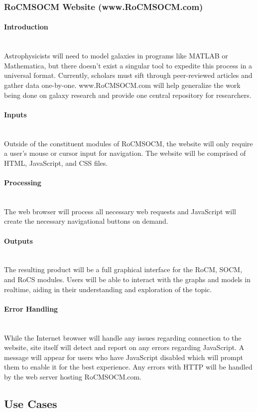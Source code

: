 \documentclass[titlepage]{article}
\newcommand{\myparagraph}[1]{\paragraph{#1}\mbox{}\\}
\begin{document}
\subsubsection{RoCMSOCM Website (www.RoCMSOCM.com)}

\myparagraph{Introduction}
Astrophysicists will need to model galaxies in programs like MATLAB or Mathematica, but there doesn't exist a singular tool to expedite this process in a universal format. Currently, scholars must sift through peer-reviewed articles and gather data one-by-one. www.RoCMSOCM.com will help generalize the work being done on galaxy research and provide one central repository for researchers.

\myparagraph{Inputs}
Outside of the constituent modules of RoCMSOCM, the website will only require a user's mouse or cursor input for navigation. The website will be comprised of HTML, JavaScript, and CSS files. 

\myparagraph{Processing}
The web browser will process all necessary web requests and JavaScript will create the necessary navigational buttons on demand.

\myparagraph{Outputs}
The resulting product will be a full graphical interface for the RoCM, SOCM, and RoCS modules. Users will be able to interact with the graphs and models in realtime, aiding in their understanding and exploration of the topic.


\myparagraph{Error Handling}
While the Internet browser will handle any issues regarding connection to the website, site itself will detect and report on any errors regarding JavaScript. A message will appear for users who have JavaScript disabled which will prompt them to enable it for the best experience. Any errors with HTTP will be handled by the web server hosting RoCMSOCM.com.

\subsection{Use Cases}
\end{document}
